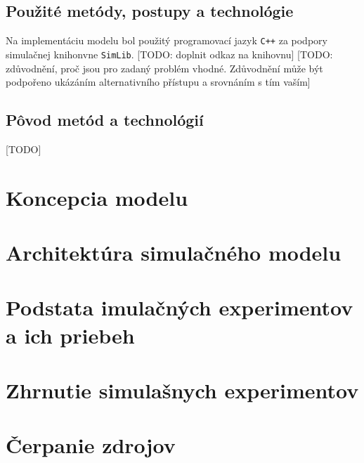 \documentclass[a4paper, 10pt]{article}
\begin{document}
        \subsection{Použité metódy, postupy a technológie}
        Na implementáciu modelu bol použitý programovací jazyk \texttt{C++} za podpory simulačnej knihonvne \texttt{SimLib}.
        [TODO: doplnit odkaz na knihovnu] [TODO:  zdůvodnění, proč jsou pro zadaný problém vhodné. Zdůvodnění může být podpořeno ukázáním alternativního přístupu a srovnáním s tím vaším]
        \subsection{Pôvod metód a technológií}
        [TODO]

    \section {Koncepcia modelu}


    \section{Architektúra simulačného modelu}

    \section{Podstata imulačných experimentov a ich priebeh}

    \section{Zhrnutie simulašnych experimentov}

    \section {Čerpanie zdrojov}
        {\cite{example}}

    \newpage
    
    
\end{document}
